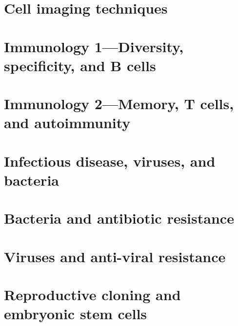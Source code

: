 \documentclass[../introbio.tex]{subfiles}
\begin{document}
\section{Cell imaging techniques}
\section{Immunology 1—Diversity, specificity, and B cells}
\section{Immunology 2—Memory, T cells, and autoimmunity}
\section{Infectious disease, viruses, and bacteria}
\section{Bacteria and antibiotic resistance}
\section{Viruses and anti-viral resistance}
\section{Reproductive cloning and embryonic stem cells}
\end{document}
